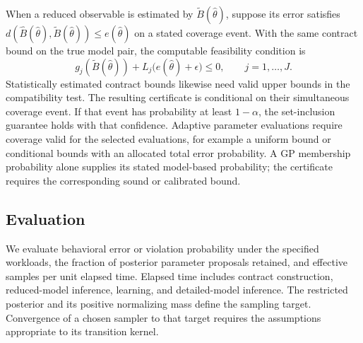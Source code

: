 When a reduced observable is estimated by $\widetilde B(\hat\theta)$,
suppose its error satisfies
$d(\widehat B(\hat\theta),\widetilde B(\hat\theta))\leq e(\hat\theta)$
on a stated coverage event. With the same contract bound on the true
model pair, the computable feasibility condition is
\[
 g_j(\widetilde B(\hat\theta))
       +L_j\bigl(e(\hat\theta)+\epsilon\bigr)\leq0,
 \qquad j=1,\ldots,J.
\]
Statistically estimated contract bounds likewise need valid upper bounds
in the compatibility test. The resulting certificate is conditional on
their simultaneous coverage event. If
that event has probability at least $1-\alpha$, the set-inclusion guarantee
holds with that confidence. Adaptive parameter evaluations require
coverage valid for the selected evaluations, for example a uniform bound
or conditional bounds with an allocated total error probability. A GP
membership probability alone supplies its stated model-based probability;
the certificate requires the corresponding sound or calibrated bound.

\subsection{Evaluation}

We evaluate behavioral error or violation probability under the specified
workloads, the fraction of posterior parameter proposals retained, and
effective samples per unit elapsed time. Elapsed time includes contract
construction, reduced-model inference, learning, and detailed-model
inference. The restricted posterior and its positive normalizing mass
define the sampling target. Convergence of a chosen sampler to that target
requires the assumptions appropriate to its transition kernel.
